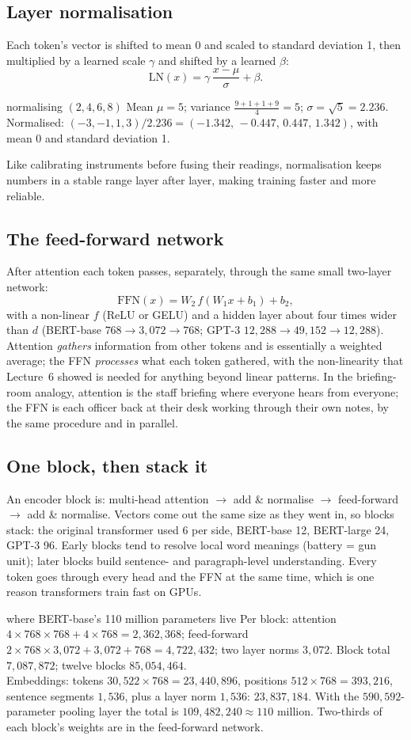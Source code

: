 \documentclass[11pt]{article}
\begin{document}
\subsection{Layer normalisation}
Each token's vector is shifted to mean 0 and scaled to standard deviation 1, then multiplied by a learned scale $\gamma$ and shifted by a learned $\beta$:
\[\text{LN}(x)=\gamma\,\frac{x-\mu}{\sigma}+\beta.\]
\begin{example}{normalising $(2,4,6,8)$}
Mean $\mu=5$; variance $\frac{9+1+1+9}{4}=5$; $\sigma=\sqrt5=2.236$. Normalised: $(-3,-1,1,3)/2.236=(-1.342,\,-0.447,\,0.447,\,1.342)$, with mean 0 and standard deviation 1.
\end{example}
Like calibrating instruments before fusing their readings, normalisation keeps numbers in a stable range layer after layer, making training faster and more reliable.

\subsection{The feed-forward network}
After attention each token passes, separately, through the same small two-layer network:
\[\text{FFN}(x)=W_2\,f(W_1x+b_1)+b_2,\]
with a non-linear $f$ (ReLU or GELU) and a hidden layer about four times wider than $d$ (BERT-base $768\to3{,}072\to768$; GPT-3 $12{,}288\to49{,}152\to12{,}288$). Attention \emph{gathers} information from other tokens and is essentially a weighted average; the FFN \emph{processes} what each token gathered, with the non-linearity that Lecture~6 showed is needed for anything beyond linear patterns. In the briefing-room analogy, attention is the staff briefing where everyone hears from everyone; the FFN is each officer back at their desk working through their own notes, by the same procedure and in parallel.

\subsection{One block, then stack it}
An encoder block is: multi-head attention $\to$ add \& normalise $\to$ feed-forward $\to$ add \& normalise. Vectors come out the same size as they went in, so blocks stack: the original transformer used 6 per side, BERT-base 12, BERT-large 24, GPT-3 96. Early blocks tend to resolve local word meanings (battery = gun unit); later blocks build sentence- and paragraph-level understanding. Every token goes through every head and the FFN at the same time, which is one reason transformers train fast on GPUs.
\begin{example}{where BERT-base's 110 million parameters live}
Per block: attention $4\times768\times768+4\times768=2{,}362{,}368$; feed-forward $2\times768\times3{,}072+3{,}072+768=4{,}722{,}432$; two layer norms $3{,}072$. Block total $7{,}087{,}872$; twelve blocks $85{,}054{,}464$.\\
Embeddings: tokens $30{,}522\times768=23{,}440{,}896$, positions $512\times768=393{,}216$, sentence segments $1{,}536$, plus a layer norm $1{,}536$: $23{,}837{,}184$. With the $590{,}592$-parameter pooling layer the total is $109{,}482{,}240\approx110$ million. Two-thirds of each block's weights are in the feed-forward network.
\end{example}
\end{document}
